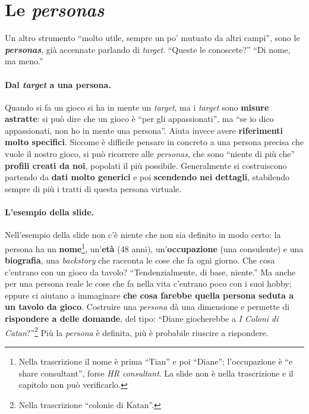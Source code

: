 \section{Le \emph{personas}}
\label{a14:sec:personas}



Un altro strumento ``molto utile, sempre un po' mutuato da altri campi'', sono le
\textbf{\emph{personas}}, già accennate parlando di \emph{target}. ``Queste le conoscete?''
``Di nome, ma meno.''

\paragraph{Dal \emph{target} a una persona.} Quando si fa un gioco si ha in mente un
\emph{target}, ma i \emph{target} sono \textbf{misure astratte}: si può dire che un gioco è
``per gli appassionati'', ma ``se io dico appassionati, non ho in mente una persona''. Aiuta
invece avere \textbf{riferimenti molto specifici}. Siccome è difficile pensare in concreto a
una persona precisa che vuole il nostro gioco, si può ricorrere alle \emph{personas}, che
sono ``niente di più che'' \textbf{profili creati da noi}, popolati il più possibile.
Generalmente si costruiscono partendo da \textbf{dati molto generici} e poi
\textbf{scendendo nei dettagli}, stabilendo sempre di più i tratti di questa persona virtuale.

\paragraph{L'esempio della slide.} Nell'esempio della slide non c'è niente che non sia
definito in modo certo: la persona ha un \textbf{nome}\footnote{Nella trascrizione il nome è
prima ``Tian'' e poi ``Diane''; l'occupazione è ``e share consultant'', forse \emph{HR
consultant}. La slide non è nella trascrizione e il capitolo non può verificarlo.},
un'\textbf{età} (48 anni), un'\textbf{occupazione} (una consulente) e una \textbf{biografia},
una \emph{backstory} che racconta le cose che fa ogni giorno. Che cosa c'entrano con un gioco
da tavolo? ``Tendenzialmente, di base, niente.'' Ma anche per una persona reale le cose che fa
nella vita c'entrano poco con i suoi hobby; eppure ci aiutano a immaginare \textbf{che cosa
farebbe quella persona seduta a un tavolo da gioco}. Costruire una \emph{persona} dà una
dimensione e permette di \textbf{rispondere a delle domande}, del tipo: ``Diane giocherebbe
a \emph{I Coloni di Catan}?''\footnote{Nella trascrizione ``colonie di Katan''.} Più la
\emph{persona} è definita, più è probabile riuscire a rispondere.

